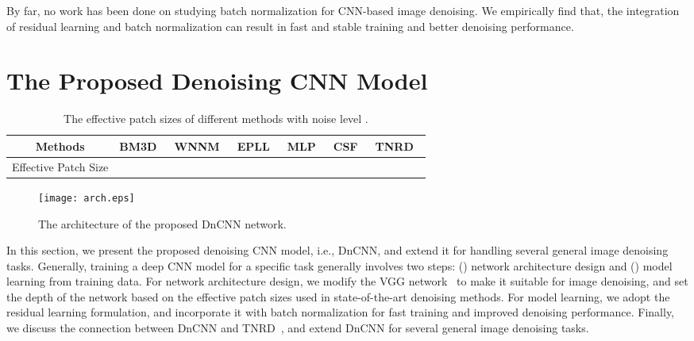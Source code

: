 \documentclass[journal]{IEEEtran}
\begin{document}
By far, no work has been done on studying batch normalization for CNN-based image denoising. We empirically find that,
the integration of residual learning and batch normalization can result in fast and stable training and better denoising performance.


\section{The Proposed Denoising CNN Model} \label{sec:model}

\begin{table*}[htbp]
\caption{The effective patch sizes of different methods with noise level .}
\center
\begin{tabular}{|c|c|c|c|c|c|c|}
  \hline
Methods & BM3D~\cite{dabov2007image}&  WNNM~\cite{gu2014weighted}& EPLL~\cite{zoran2011learning}& MLP~\cite{burger2012image}  & CSF~\cite{schmidt2014shrinkage} & TNRD~\cite{chen2015trainable} \\ \hline
  Effective Patch Size &  &  & &  &  &    \\
  \hline
\end{tabular}
\label{table11}
\end{table*}


\begin{figure*}[htbp]
  \centering
\texttt{[image: arch.eps]}\\
  \caption{The architecture of the proposed DnCNN network.}\label{fig1}\vspace{-0.3cm}
\end{figure*}




In this section, we present the proposed denoising CNN model, i.e., DnCNN, and extend it for handling several general image denoising tasks. Generally, training a deep CNN model for a specific task generally involves two steps: () network architecture design and () model learning from training data. For network architecture design, we modify the VGG network~\cite{simonyan2014very} to make it suitable for image denoising, and set the depth of the network based on the effective patch sizes used in state-of-the-art denoising methods. For model learning, we adopt the residual learning formulation, and incorporate it with batch normalization for fast training and improved denoising performance. Finally, we discuss the connection between DnCNN and TNRD~\cite{chen2015trainable}, and extend DnCNN for {several general image denoising tasks}.
\end{document}
